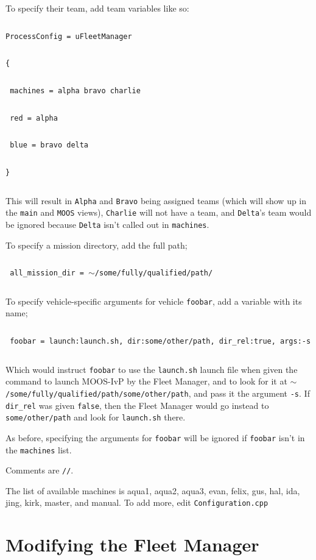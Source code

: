 \documentclass[11pt]{article}
\newcommand{\cmdline}[1]{\vspace{.2em} $\:$\\ \begin{minipage}{\dimexpr\textwidth-2cm}
\texttt{#1}
\end{minipage} $\:$\\ \vspace{-.2em} }
\begin{document}
To specify their team, add team variables like so:

\cmdline{ProcessConfig = uFleetManager}
\cmdline{\{}
\cmdline{	machines = alpha bravo charlie}
\cmdline{	red = alpha}
\cmdline{	blue = bravo delta}
\cmdline{\}}

This will result in \texttt{Alpha} and \texttt{Bravo} being assigned teams (which will show up in the \texttt{main} and \texttt{MOOS} views), \texttt{Charlie} will not have a team, and \texttt{Delta}'s team would be ignored because \texttt{Delta} isn't called out in \texttt{machines}.

To specify a mission directory, add the full path;

\cmdline{	all\_mission\_dir = $\sim$/some/fully/qualified/path/}

To specify vehicle-specific arguments for vehicle \texttt{foobar}, add a variable with its name;

\cmdline{	foobar = launch:launch.sh, dir:some/other/path, dir\_rel:true, args:-s}

Which would instruct \texttt{foobar} to use the \texttt{launch.sh} launch file when given the command to launch MOOS-IvP by the Fleet Manager, and to look for it at \texttt{$\sim$/some/fully/qualified/path/some/other/path}, and pass it the argument \texttt{-s}. If \texttt{dir\_rel} was given \texttt{false}, then the Fleet Manager would go instead to \texttt{some/other/path} and look for \texttt{launch.sh} there.

As before, specifying the arguments for \texttt{foobar} will be ignored if \texttt{foobar} isn't in the \texttt{machines} list.

Comments are \texttt{//}.

The list of available machines is aqua1, aqua2, aqua3, evan, felix, gus, hal, ida, jing, kirk, master, and manual. To add more, edit \texttt{Configuration.cpp}

\section{Modifying the Fleet Manager}
\end{document}
